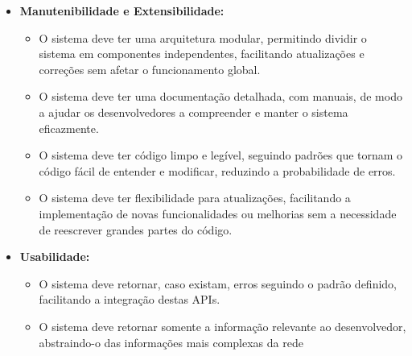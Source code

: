 \begin{itemize}
  \item \textbf{Manutenibilidade e Extensibilidade:}
    \begin{itemize}
      \item O sistema deve ter uma arquitetura modular, permitindo dividir o sistema em componentes independentes, facilitando atualizações e correções sem afetar o funcionamento global.
      \item O sistema deve ter uma documentação detalhada, com manuais, de modo a ajudar os desenvolvedores a compreender e manter o sistema eficazmente.
      \item O sistema deve ter código limpo e legível, seguindo padrões que tornam o código fácil de entender e modificar, reduzindo a probabilidade de erros.
      \item O sistema deve ter flexibilidade para atualizações, facilitando a implementação de novas funcionalidades ou melhorias sem a necessidade de reescrever grandes partes do código.
    \end{itemize}
  \item \textbf{Usabilidade:}
    \begin{itemize}
      \item O sistema deve retornar, caso existam, erros seguindo o padrão definido, facilitando a integração destas APIs.
      \item O sistema deve retornar somente a informação relevante ao desenvolvedor, abstraindo-o das informações mais complexas da rede
    \end{itemize}
\end{itemize}
